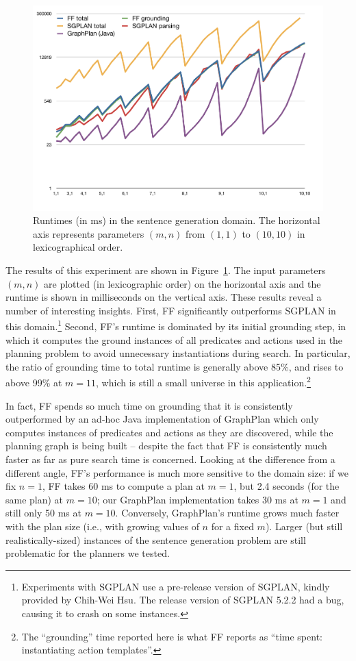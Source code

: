 \begin{figure}
  \centering
  \includegraphics[width=1\columnwidth]{pic-runtime-modifiers-with-sgplan}
  \caption{Runtimes (in ms) in the sentence generation domain.  The
    horizontal axis represents parameters $(m,n)$ from $(1,1)$ to
    $(10,10)$ in lexicographical order.}
  \label{fig:runtimes-crisp}
\end{figure}

The results of this experiment are shown in
Figure~\ref{fig:runtimes-crisp}. The input parameters $(m,n)$ are plotted
(in lexicographic order) on the horizontal axis and the runtime is shown in
milliseconds on the vertical axis. These results reveal a number of
interesting insights. First, FF significantly outperforms
SGPLAN in this domain.\footnote{Experiments with SGPLAN use a
 pre-release version of SGPLAN, kindly provided by Chih-Wei Hsu. The
 release version of SGPLAN 5.2.2 had a bug, causing it to crash on some
 instances.}
Second, FF's runtime is dominated by its initial grounding step, in which
it computes the ground instances of all predicates and actions used in the
planning problem to avoid unnecessary instantiations during search. In
particular, the ratio of grounding time to total runtime is generally above
85\%, and rises to above 99\% at $m=11$, which is still a small universe in
this application.\footnote{The
  ``grounding'' time reported here is what FF reports as ``time spent:
  instantiating action templates''.} 

In fact, FF spends so much time on grounding that it is consistently
outperformed by an ad-hoc Java implementation of GraphPlan which only
computes instances of predicates and actions as they are discovered,
while the planning graph is being built -- despite the fact that FF is
consistently much faster as far as pure search time is concerned.
Looking at the difference from a different angle, FF's performance is
much more sensitive to the domain size: if we fix $n=1$, FF takes 60
ms to compute a plan at $m=1$, but 2.4 seconds (for the same plan) at
$m=10$; our GraphPlan implementation takes 30 ms at $m=1$ and still
only 50 ms at $m=10$.  Conversely, GraphPlan's runtime grows much
faster with the plan size (i.e., with growing values of $n$ for a
fixed $m$).  Larger (but still realistically-sized) instances of the
sentence generation problem are still problematic for the planners we
tested.



